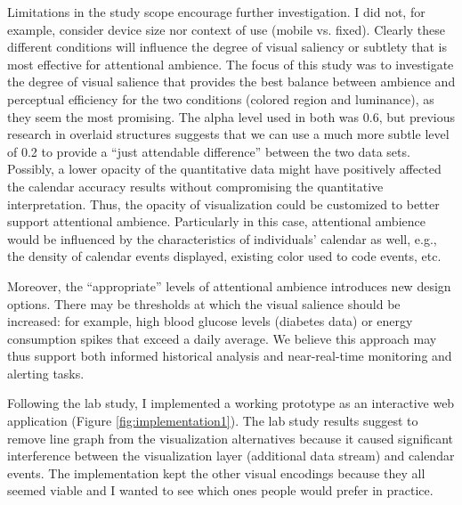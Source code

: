 \documentclass[12pt,oneside]{book}
\begin{document}
Limitations in the study scope encourage further investigation. I did not, for example, consider device size nor context of use (mobile vs. fixed). Clearly these different conditions will influence the degree of visual saliency or subtlety that is most effective for attentional ambience. The focus of this study was to investigate the degree of visual salience that provides the best balance between ambience and perceptual efficiency for the two conditions (colored region and luminance), as they seem the most promising. The alpha level used in both was 0.6, but previous research in overlaid structures suggests that we can use a much more subtle level of 0.2 to provide a ``just attendable difference'' \cite{bartram_effect_2011} between the two data sets. Possibly, a lower opacity of the quantitative data might have positively affected the calendar accuracy results without compromising the quantitative interpretation. Thus, the opacity of visualization could be customized to better support attentional ambience. Particularly in this case, attentional ambience would be influenced by the characteristics of individuals' calendar as well, e.g., the density of calendar events displayed, existing color used to code events, etc.

Moreover, the ``appropriate'' levels of attentional ambience introduces new design options.  There may be thresholds at which the visual salience should be increased: for example, high blood glucose levels (diabetes data) or energy consumption spikes that exceed a daily average. We believe this approach may thus support both informed historical analysis and near-real-time monitoring and alerting tasks.




\label{chap:implementaiton}

Following the lab study, I implemented a working prototype as an interactive web application (Figure \ref{fig:implementation1}). The lab study results suggest to remove line graph from the visualization alternatives because it caused significant interference between the visualization layer (additional data stream) and calendar events. The implementation kept the other visual encodings because they all seemed viable and I wanted to see which ones people would prefer in practice. 
\end{document}
